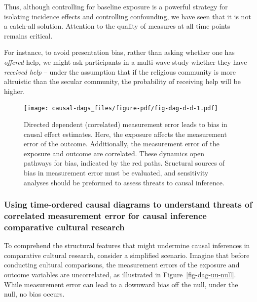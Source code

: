 \documentclass[
  singlecolumn]{article}
\begin{document}
Thus, although controlling for baseline exposure is a powerful strategy
for isolating incidence effects and controlling confounding, we have
seen that it is not a catch-all solution. Attention to the quality of
measures at all time points remains critical.

For instance, to avoid presentation bias, rather than asking whether one
has \emph{offered} help, we might ask participants in a multi-wave study
whether they have \emph{received help} -- under the assumption that if
the religious community is more altruistic than the secular community,
the probability of receiving help will be higher.

\begin{figure}

{\centering \texttt{[image: causal-dags\_files/figure-pdf/fig-dag-d-d-1.pdf]}

}

\caption{\label{fig-dag-d-d}Directed dependent (correlated) measurement
error leads to bias in causal effect estimates. Here, the exposure
affects the measurement error of the outcome. Additionally, the
measurement error of the exposure and outcome are correlated. These
dynamics open pathways for bias, indicated by the red paths. Sructural
sources of bias in measurement error must be evaluated, and sensitivity
analyses should be preformed to assess threats to causal inference.}

\end{figure}

\hypertarget{using-time-ordered-causal-diagrams-to-understand-threats-of-correlated-measurement-error-for-causal-inference-comparative-cultural-research}{%
\subsubsection{Using time-ordered causal diagrams to understand threats
of correlated measurement error for causal inference comparative
cultural
research}\label{using-time-ordered-causal-diagrams-to-understand-threats-of-correlated-measurement-error-for-causal-inference-comparative-cultural-research}}

To comprehend the structural features that might undermine causal
inferences in comparative cultural research, consider a simplified
scenario. Imagine that before conducting cultural comparisons, the
measurement errors of the exposure and outcome variables are
uncorrelated, as illustrated in Figure~\ref{fig-dag-uu-null}. While
measurement error can lead to a downward bias off the null, under the
null, no bias occurs.
\end{document}
